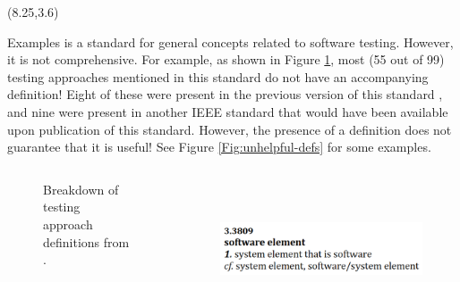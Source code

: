 \documentclass[22pt]{beamer}
\begin{document}
\begin{frame}[fragile]
    \begin{textblock}{7.25}(8.25,3.6)
        \begin{block}{\fontsize{37}{20}\selectfont Examples}
            \cite{IEEE2022} is a standard for general concepts related to
            software testing. However, it is not comprehensive. For example, as
            shown in Figure \ref{Fig:IEEEdefs}, most (55 out of 99) testing
            approaches mentioned in this standard do not have an accompanying
            definition! Eight of these were present in the previous version of
            this standard \cite{IEEE2013}, and nine were present in another
            IEEE standard \cite{IEEE2017} that would have been available
            upon publication of this standard. However, the presence of a
            definition does not guarantee that it is useful! See Figure
            \ref{Fig:unhelpful-defs} for some examples.

            \begin{columns}
                \begin{column}{0.4\textwidth}
                    \begin{center}
                        \begin{figure}
                            \label{Fig:IEEEdefs}
                            \caption{Breakdown of testing approach definitions from \cite{IEEE2022}.}
                        \end{figure}
                    \end{center}
                \end{column}
                \begin{column}{0.4\textwidth}
                    \begin{center}
                        \begin{figure}
                            \includegraphics[height=4cm]{software element.png}


\end{figure}
\end{center}
\end{column}
\end{columns}
\end{block}
\end{textblock}
\end{frame}
\end{document}

